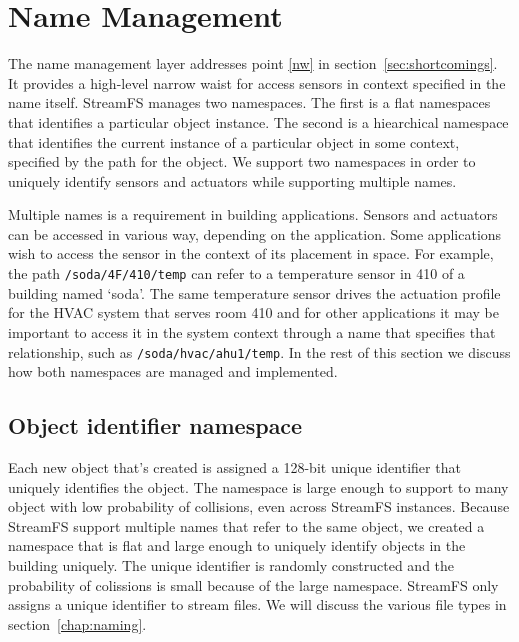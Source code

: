\section{Name Management}
The name management layer addresses point \ref{nw} in section~\ref{sec:shortcomings}.  It provides a high-level
narrow waist for access sensors in context specified in the name itself.
StreamFS manages two namespaces.  The first is a flat namespaces that identifies a particular
object instance.  The second is a hiearchical namespace that identifies the current instance
of a particular object in some context, specified by the path for the object.  
We support two namespaces in order to uniquely identify sensors and actuators while supporting multiple names.

Multiple names is a requirement in building applications.  Sensors and actuators can be accessed in various 
way, depending on the application.  Some applications wish to access the sensor in the context of its placement 
in space.  For example, the path \texttt{/soda/4F/410/temp} can refer to a temperature sensor in 410 of a building
named `soda'.  The same temperature sensor drives the actuation profile for the HVAC system that serves room
410 and for other applications it may be important to access it in the system context through a name that specifies
that relationship, such as \texttt{/soda/hvac/ahu1/temp}.
In the rest of this section we discuss how both namespaces are managed and implemented.

\subsection{Object identifier namespace}

Each new object that's created is assigned a 128-bit unique identifier that uniquely identifies the object.
The namespace is large enough to support to many object with low probability of collisions, even across
StreamFS instances.
Because StreamFS support multiple names that refer to the same object, we created a namespace that is 
flat and large enough to uniquely identify objects in the building uniquely.  The unique identifier
is randomly constructed and the probability of colissions is small because of the large namespace.
StreamFS only assigns a unique identifier to stream files.  We will discuss the various file types in
section~\ref{chap:naming}.



